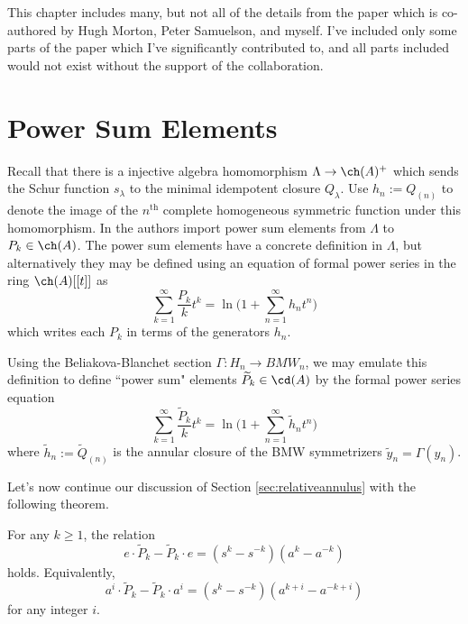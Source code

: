This chapter includes many, but not all of the details from the paper \cite{MPS20} which is co-authored by Hugh Morton, Peter Samuelson, and myself. I've included only some parts of the paper which I've significantly contributed to, and all parts included would not exist without the support of the collaboration. 




\section{Power Sum Elements} \label{sec:powersumelements}

Recall that there is a injective algebra homomorphism $\Lambda \to \ch(A)^+$ which sends the Schur function $s_\lambda$ to the minimal idempotent closure $Q_\lambda$. Use $h_n := Q_{(n)}$ to denote the image of the $n^\textrm{th}$ complete homogeneous symmetric function under this homomorphism. In \cite{MS17} the authors import power sum elements from $\Lambda$ to $P_k \in \ch(A)$. The power sum elements have a concrete definition in $\Lambda$, but alternatively they may be defined using an equation of formal power series in the ring $\ch(A)[[t]]$ as
\begin{equation}
\sum_{k=1}^\infty \frac{P_k}{k} t^k = \ln \Bigg( 1 + \sum_{n=1}^\infty h_n t^n \Bigg)
\end{equation}
which writes each $P_k$ in terms of the generators $h_n$. 

Using the Beliakova-Blanchet section $\Gamma: H_n \to BMW_n$, we may emulate this definition to define ``power sum" elements $\widetilde{P}_k \in \cd(A)$ by the formal power series equation
\begin{equation}
\sum_{k=1}^\infty \frac{\widetilde{P}_k}{k} t^k = \ln \Bigg( 1 + \sum_{n=1}^\infty \tilde{h}_n t^n \Bigg)
\end{equation}
where $\tilde{h}_n := \widetilde{Q}_{(n)}$ is the annular closure of the BMW symmetrizers $\tilde{y}_n = \Gamma(y_n)$.

Let's now continue our discussion of Section \ref{sec:relativeannulus} with the following theorem.

\begin{theorem} \label{thm:powersumcommutator}
For any $k \geq 1$, the relation
\begin{equation} \label{eq:powersumcommutator}
e \cdot \widetilde{P}_k - \widetilde{P}_k \cdot e = (s^k - s^{-k}) (a^k - a^{-k})
\end{equation}
holds. Equivalently,
\begin{equation}
a^i \cdot \widetilde{P}_k - \widetilde{P}_k \cdot a^i = (s^k - s^{-k}) (a^{k+i} - a^{-k+i})
\end{equation}
for any integer $i$.
\end{theorem}

